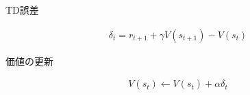 TD誤差


\begin{align}
\delta_{t} = r_{t+1} + \gamma V(s_{t+1}) - V(s_{t})
\end{align}


価値の更新


\begin{align}
V(s_{t}) \leftarrow V(s_{t}) + \alpha \delta_{t}
\end{align}
